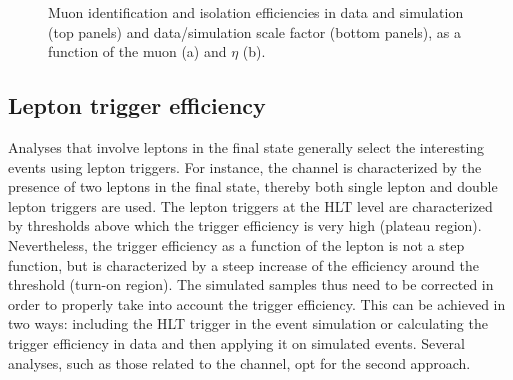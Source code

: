 \begin{figure}[htb]
\centering
{}
\caption{Muon identification and isolation efficiencies in data and simulation (top panels) and data/simulation scale factor (bottom panels), as a function of the muon \pt (a) and $\eta$ (b).}\label{fig:muIdIso}
\end{figure}	
	
	
\subsection{Lepton trigger efficiency}\label{sec:trigeff}
Analyses that involve leptons in the final state generally select the interesting events using lepton triggers. For instance, the \hwwllnn channel is characterized by the presence of two leptons in the final state, thereby both single lepton and double lepton triggers are used. The lepton triggers at the HLT level are characterized by \pt thresholds above which the trigger efficiency is very high (plateau region). Nevertheless, the trigger efficiency as a function of the lepton \pt is not a step function, but is characterized by a steep increase of the efficiency around the \pt threshold (turn-on region). The simulated samples thus need to be corrected in order to properly take into account the trigger efficiency. This can be achieved in two ways: including the HLT trigger in the event simulation or calculating the trigger efficiency in data and then applying it on simulated events. Several analyses, such as those related to the \hwwllnn channel, opt for the second approach.

